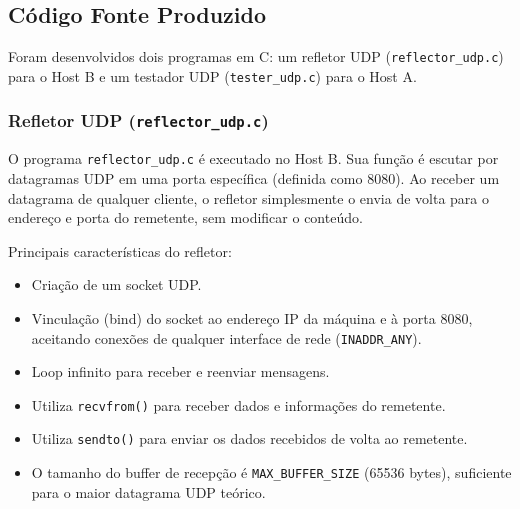 \subsection{Código Fonte Produzido}
\label{subsec:codigo_exp2}
Foram desenvolvidos dois programas em C: um refletor UDP (\texttt{reflector\_udp.c}) para o Host B e um testador UDP (\texttt{tester\_udp.c}) para o Host A.

\subsubsection{Refletor UDP (\texttt{reflector\_udp.c})}
O programa \texttt{reflector\_udp.c} é executado no Host B. Sua função é escutar por datagramas UDP em uma porta específica (definida como 8080). Ao receber um datagrama de qualquer cliente, o refletor simplesmente o envia de volta para o endereço e porta do remetente, sem modificar o conteúdo.

Principais características do refletor:
\begin{itemize}
    \item Criação de um socket UDP.
    \item Vinculação (bind) do socket ao endereço IP da máquina e à porta 8080, aceitando conexões de qualquer interface de rede (\texttt{INADDR\_ANY}).
    \item Loop infinito para receber e reenviar mensagens.
    \item Utiliza \texttt{recvfrom()} para receber dados e informações do remetente.
    \item Utiliza \texttt{sendto()} para enviar os dados recebidos de volta ao remetente.
    \item O tamanho do buffer de recepção é \texttt{MAX\_BUFFER\_SIZE} (65536 bytes), suficiente para o maior datagrama UDP teórico.
\end{itemize}

